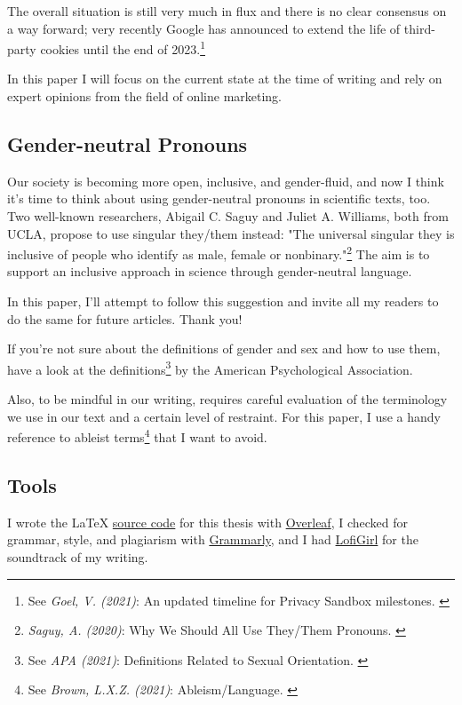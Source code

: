 The overall situation is still very much in flux and there is no clear consensus on a way forward; very recently Google has announced to extend the life of third-party cookies until the end of 2023.\footnote{See \textit{Goel, V. (2021)}: An updated timeline for Privacy Sandbox milestones. \cite{sandboxDelay}}

In this paper I will focus on the current state at the time of writing and rely on expert opinions from the field of online marketing.

\subsection{Gender-neutral Pronouns}

Our society is becoming more open, inclusive, and gender-fluid, and now I think it's time to think about using gender-neutral pronouns in scientific texts, too. Two well-known researchers, Abigail C. Saguy and Juliet A. Williams, both from UCLA, propose to use singular they/them instead: "The universal singular they is inclusive of people who identify as male, female or nonbinary."\footnote{\textit{Saguy, A. (2020)}: Why We Should All Use They/Them Pronouns. \cite{pronouns}} The aim is to support an inclusive approach in science through gender-neutral language. 

In this paper, I'll attempt to follow this suggestion and invite all my readers to do the same for future articles. Thank you!

If you're not sure about the definitions of gender and sex and how to use them, have a look at the definitions\footnote{See \textit{APA (2021)}: Definitions Related to Sexual Orientation. \cite{apaDefinitions}} by the American Psychological Association.

Also, to be mindful in our writing, requires careful evaluation of the terminology we use in our text and a certain level of restraint. For this paper, I use a handy reference to ableist terms\footnote{See \textit{Brown, L.X.Z. (2021)}: Ableism/Language. \cite{ableismLanguage}} that I want to avoid.

\subsection{Tools}

I wrote the LaTeX \href{https://github.com/chfrank-cgn/Bachelor-Arbeit}{source code} for this thesis with \href{https://www.overleaf.com/}{Overleaf}, I checked for grammar, style, and plagiarism with \href{https://app.grammarly.com/}{Grammarly}, and I had \href{https://www.youtube.com/watch?v=5qap5aO4i9A}{LofiGirl} for the soundtrack of my writing.

